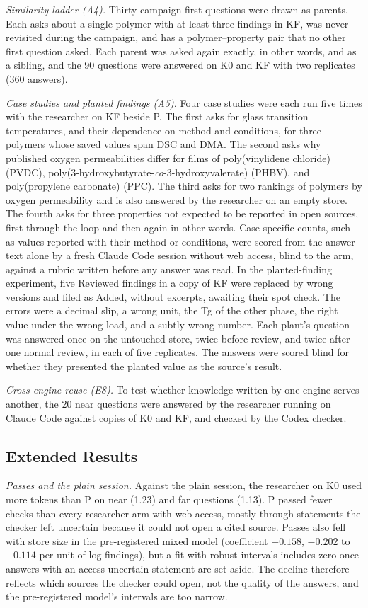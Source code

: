 \documentclass[journal=mamobx,manuscript=suppinfo]{achemso}
\begin{document}
\emph{Similarity ladder (A4).}
Thirty campaign first questions were drawn as parents.
Each asks about a single polymer with at least three findings in KF, was never revisited during the campaign, and has a polymer--property pair that no other first question asked.
Each parent was asked again exactly, in other words, and as a sibling, and the 90 questions were answered on K0 and KF with two replicates (360 answers).

\emph{Case studies and planted findings (A5).}
Four case studies were each run five times with the researcher on KF beside P.
The first asks for glass transition temperatures, and their dependence on method and conditions, for three polymers whose saved values span DSC and DMA.
The second asks why published oxygen permeabilities differ for films of poly(vinylidene chloride) (PVDC), poly(3-hydroxybutyrate-\emph{co}-3-hydroxyvalerate) (PHBV), and poly(propylene carbonate) (PPC).
The third asks for two rankings of polymers by oxygen permeability and is also answered by the researcher on an empty store.
The fourth asks for three properties not expected to be reported in open sources, first through the loop and then again in other words.
Case-specific counts, such as values reported with their method or conditions, were scored from the answer text alone by a fresh Claude Code session without web access, blind to the arm, against a rubric written before any answer was read.
In the planted-finding experiment, five Reviewed findings in a copy of KF were replaced by wrong versions and filed as Added, without excerpts, awaiting their spot check.
The errors were a decimal slip, a wrong unit, the Tg of the other phase, the right value under the wrong load, and a subtly wrong number.
Each plant's question was answered once on the untouched store, twice before review, and twice after one normal review, in each of five replicates.
The answers were scored blind for whether they presented the planted value as the source's result.

\emph{Cross-engine reuse (E8).}
To test whether knowledge written by one engine serves another, the 20 near questions were answered by the researcher running on Claude Code against copies of K0 and KF, and checked by the Codex checker.

\subsection{Extended Results}

\emph{Passes and the plain session.}
Against the plain session, the researcher on K0 used more tokens than P on near (1.23) and far questions (1.13).
P passed fewer checks than every researcher arm with web access, mostly through statements the checker left uncertain because it could not open a cited source.
Passes also fell with store size in the pre-registered mixed model (coefficient $-0.158$, $-0.202$ to $-0.114$ per unit of log findings), but a fit with robust intervals includes zero once answers with an access-uncertain statement are set aside.
The decline therefore reflects which sources the checker could open, not the quality of the answers, and the pre-registered model's intervals are too narrow.
\end{document}

